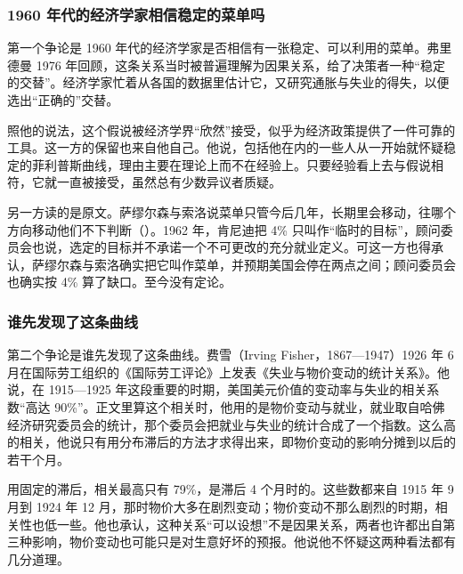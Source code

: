 \subsubsection{1960 年代的经济学家相信稳定的菜单吗}

第一个争论是 1960 年代的经济学家是否相信有一张稳定、可以利用的菜单。弗里德曼 1976 年回顾，这条关系当时被普遍理解为因果关系，给了决策者一种“稳定的交替”\cite{friedman1976}。经济学家忙着从各国的数据里估计它，又研究通胀与失业的得失，以便选出“正确的”交替\cite{friedman1976}。

照他的说法，这个假说被经济学界“欣然”接受，似乎为经济政策提供了一件可靠的工具\cite{friedman1976}。这一方的保留也来自他自己。他说，包括他在内的一些人从一开始就怀疑稳定的菲利普斯曲线，理由主要在理论上而不在经验上\cite{friedman1976}。只要经验看上去与假说相符，它就一直被接受，虽然总有少数异议者质疑\cite{friedman1976}。

另一方读的是原文。萨缪尔森与索洛说菜单只管今后几年，长期里会移动，往哪个方向移动他们不下判断（）。1962 年，肯尼迪把 4\% 只叫作“临时的目标”，顾问委员会也说，选定的目标并不承诺一个不可更改的充分就业定义\cite{erp1962}。可这一方也得承认，萨缪尔森与索洛确实把它叫作菜单，并预期美国会停在两点之间；顾问委员会也确实按 4\% 算了缺口\cite{samuelson1960,erp1962}。至今没有定论。

\subsubsection{谁先发现了这条曲线}

第二个争论是谁先发现了这条曲线。费雪（Irving Fisher，1867—1947）1926 年 6 月在国际劳工组织的《国际劳工评论》上发表《失业与物价变动的统计关系》\cite{fisher1926,loc38}。他说，在 1915—1925 年这段重要的时期，美国美元价值的变动率与失业的相关系数“高达 90\%”\cite{fisher1926}。正文里算这个相关时，他用的是物价变动与就业，就业取自哈佛经济研究委员会的统计，那个委员会把就业与失业的统计合成了一个指数\cite{fisher1926}。这么高的相关，他说只有用分布滞后的方法才求得出来，即物价变动的影响分摊到以后的若干个月\cite{fisher1926}。

用固定的滞后，相关最高只有 79\%，是滞后 4 个月时的\cite{fisher1926}。这些数都来自 1915 年 9 月到 1924 年 12 月，那时物价大多在剧烈变动；物价变动不那么剧烈的时期，相关性也低一些\cite{fisher1926}。他也承认，这种关系“可以设想”不是因果关系，两者也许都出自第三种影响，物价变动也可能只是对生意好坏的预报\cite{fisher1926}。他说他不怀疑这两种看法都有几分道理\cite{fisher1926}。


